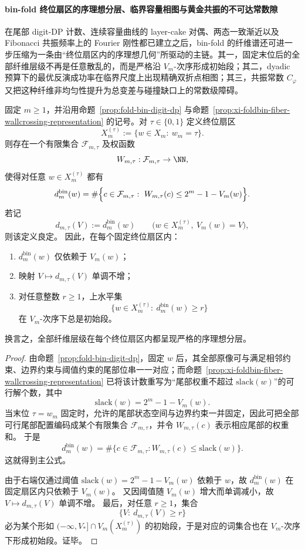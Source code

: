 \paragraph{bin-fold 终位扇区的序理想分层、临界容量相图与黄金共振的不可达常数隙}
在尾部 digit-DP 计数、连续容量曲线的 layer-cake 对偶、两态一致渐近以及 Fibonacci 共振频率上的 Fourier 刚性都已建立之后，bin-fold 的纤维谱还可进一步压缩为一条由“终位扇区内的序理想几何”所驱动的主链。其一，固定末位后的全部纤维层级不再是任意散乱的，而是严格沿 \(V_m\)-次序形成初始段；其二，dyadic 预算下的最优反演成功率在临界尺度上出现精确双折点相图；其三，共振常数 \(C_\varphi\) 又把这种纤维非均匀性提升为总变差与碰撞缺口上的常数级障碍。

\begin{theorem}[终位扇区内的序理想分层]\label{thm:xi-time-part55ba-terminal-sector-order-ideal}
固定 \(m\ge 1\)，并沿用命题~\ref{prop:fold-bin-digit-dp} 与命题~\ref{prop:xi-foldbin-fiber-wallcrossing-representation} 的记号。对 \(\tau\in\{0,1\}\) 定义终位扇区
\[
X_m^{(\tau)}:=\{w\in X_m:\ w_m=\tau\}.
\]
则存在一个有限集合 \(\mathcal F_{m,\tau}\) 及权函数
\[
W_{m,\tau}:\mathcal F_{m,\tau}\to \NN,
\]
使得对任意 \(w\in X_m^{(\tau)}\) 都有
\[
d_m^{\mathrm{bin}}(w)
=
\#\Bigl\{c\in\mathcal F_{m,\tau}:\
W_{m,\tau}(c)\le 2^m-1-V_m(w)\Bigr\}.
\]
若记
\[
d_{m,\tau}(V):=d_m^{\mathrm{bin}}(w)
\qquad
\bigl(w\in X_m^{(\tau)},\ V_m(w)=V\bigr),
\]
则该定义良定。
因此，在每个固定终位扇区内：
\begin{enumerate}
  \item \(d_m^{\mathrm{bin}}(w)\) 仅依赖于 \(V_m(w)\)；
  \item 映射 \(V\mapsto d_{m,\tau}(V)\) 单调不增；
  \item 对任意整数 \(r\ge 1\)，上水平集
  \[
  \{w\in X_m^{(\tau)}:\ d_m^{\mathrm{bin}}(w)\ge r\}
  \]
  在 \(V_m\)-次序下总是初始段。
\end{enumerate}
换言之，全部纤维层级在每个终位扇区内都呈现严格的序理想分层。
\end{theorem}
\begin{proof}
由命题~\ref{prop:fold-bin-digit-dp}，固定 \(w\) 后，其全部原像可与满足相邻约束、边界约束与阈值约束的尾部位串一一对应；而命题~\ref{prop:xi-foldbin-fiber-wallcrossing-representation} 已将该计数重写为“尾部权重不超过 \(\mathrm{slack}(w)\)”的可行解个数，其中
\[
\mathrm{slack}(w)=2^m-1-V_m(w).
\]
当末位 \(\tau=w_m\) 固定时，允许的尾部状态空间与边界约束一并固定，因此可把全部可行尾部配置编码成某个有限集合 \(\mathcal F_{m,\tau}\)，并令 \(W_{m,\tau}(c)\) 表示相应尾部的权重和。
于是
\[
d_m^{\mathrm{bin}}(w)
=
\#\{c\in\mathcal F_{m,\tau}:W_{m,\tau}(c)\le \mathrm{slack}(w)\}.
\]
这就得到主公式。

由于右端仅通过阈值 \(\mathrm{slack}(w)=2^m-1-V_m(w)\) 依赖于 \(w\)，故 \(d_m^{\mathrm{bin}}(w)\) 在固定扇区内只依赖于 \(V_m(w)\)。
又因阈值随 \(V_m(w)\) 增大而单调减小，故 \(V\mapsto d_{m,\tau}(V)\) 单调不增。
最后，对任意 \(r\ge 1\)，集合
\[
\{V:\ d_{m,\tau}(V)\ge r\}
\]
必为某个形如 \((-\infty,V_\ast]\cap V_m(X_m^{(\tau)})\) 的初始段，于是对应的词集合也在 \(V_m\)-次序下形成初始段。证毕。
\end{proof}

